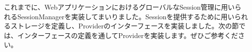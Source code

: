 これまでに、WebアプリケーションにおけるグローバルなSession管理に用いられるSessionManagerを実装してまいりました。Sessionを提供するために用いられるストレージを定義し、Providerのインターフェースを実装しました。次の節では、インターフェースの定義を通してProviderを実装します。ぜひご参考ください。

